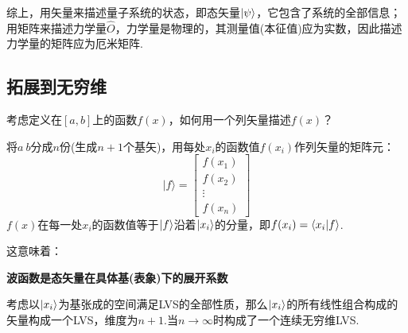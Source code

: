 综上，用矢量来描述量子系统的状态，即态矢量$\ket{\psi}$，它包含了系统的全部信息；用矩阵来描述力学量$\hat{O}$，力学量是物理的，其测量值(本征值)应为实数，因此描述力学量的矩阵应为厄米矩阵.

\subsection{拓展到无穷维}
\begin{question}
    考虑定义在$[a,b]$上的函数$f(x)$，如何用一个列矢量描述$f(x)$？

    \begin{center}
    \end{center}
\end{question}
\begin{solution}
    将$a~b$分成$n$份(生成$n+1$个基矢)，用每处$x_i$的函数值$f(x_i)$作列矢量的矩阵元：
    $$|f\rangle = \begin{bmatrix} f(x_1) \\ f(x_2) \\ \vdots \\ f(x_n) \end{bmatrix}$$
    $f(x)$在每一处$x_i$的函数值等于$\ket{f}$沿着$\ket{x_i}$的分量，即$f(x_i) = \braket{x_i}{f}$.
\end{solution}

这意味着：
\begin{center}
    \textbf{波函数是态矢量在具体基(表象)下的展开系数}
\end{center}
考虑以$\ket{x_i}$为基张成的空间满足LVS的全部性质，那么$\ket{x_i}$的所有线性组合构成的矢量构成一个LVS，维度为$n+1$.当$n \rightarrow \infty$时构成了一个连续无穷维LVS.

